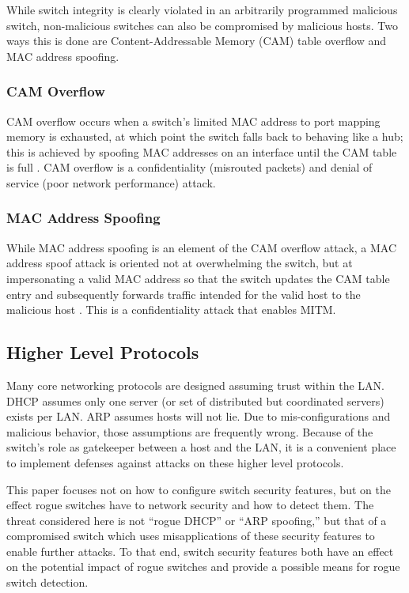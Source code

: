 \documentclass[journal]{IEEEtran}
\begin{document}
While switch integrity is clearly violated in an arbitrarily programmed malicious switch,
non-malicious switches can also be compromised by malicious hosts. Two ways this is done are
Content-Addressable Memory (CAM) table overflow and MAC address spoofing.

\subsubsection{CAM Overflow} CAM overflow occurs when a switch's limited MAC address to port mapping
memory is exhausted, at which point the switch falls back to behaving like a hub; this is achieved
by spoofing MAC addresses on an interface until the CAM table is full \cite{b1}. CAM overflow is a
confidentiality (misrouted packets) and denial of service (poor network performance) attack.

\subsubsection{MAC Address Spoofing} While MAC address spoofing is an element of the CAM overflow
attack, a MAC address spoof attack is oriented not at overwhelming the switch, but at impersonating
a valid MAC address so that the switch updates the CAM table entry and subsequently forwards
traffic intended for the valid host to the malicious host \cite{b1}. This is a confidentiality
attack that enables MITM.

\subsection{Higher Level Protocols}
Many core networking protocols are designed assuming trust within the LAN. DHCP assumes only one
server (or set of distributed but coordinated servers) exists per LAN. ARP assumes hosts will not
lie. Due to mis-configurations and malicious behavior, those assumptions are frequently wrong.
Because of the switch's role as gatekeeper between a host and the LAN, it is a convenient place to
implement defenses against attacks on these higher level protocols.

This paper focuses not on how to configure switch security features, but on the effect rogue
switches have to network security and how to detect them. The threat considered here is not ``rogue
DHCP'' or ``ARP spoofing,'' but that of a compromised switch which uses misapplications of these
security features to enable further attacks. To that end, switch security features both have an
effect on the potential impact of rogue switches and provide a possible means for rogue switch
detection.
\end{document}
